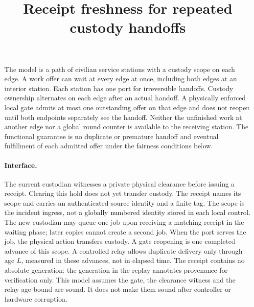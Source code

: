 \documentclass[11pt]{article}
\title{Receipt freshness for repeated custody handoffs}
\date{}
\begin{document}
\maketitle
The model is a path of civilian service stations with a custody scope on each
edge. A work offer can wait at every edge at once, including both edges at an
interior station. Each station has one port for irreversible handoffs. Custody
ownership alternates on each edge after an actual handoff. A physically
enforced local gate admits at most one outstanding offer on that edge and
does not reopen until both endpoints separately see the handoff. Neither
the unfinished work at another edge nor a global round counter is available
to the receiving station. The functional guarantee is no duplicate or
premature handoff and eventual fulfillment of each admitted offer under the
fairness conditions below.

\paragraph{Interface.}
The current custodian witnesses a private physical clearance before issuing a
receipt. Clearing this hold does not yet transfer custody. The receipt names
its scope and carries an authenticated source identity and a finite tag. The
scope is the incident ingress, not a globally numbered identity stored in
each local control. The new custodian may queue one job upon receiving a
matching receipt in the waiting phase; later copies cannot create a second
job. When the port serves the job, the physical action transfers custody.
A gate reopening is one completed advance of this scope. A controlled relay
allows duplicate delivery only through age \(L\), measured in these advances,
not in elapsed time. The receipt contains no absolute generation; the
generation in the replay annotates provenance for verification only. This
model assumes the gate, the clearance witness and the relay age bound are
sound. It does not make them sound after controller or hardware corruption.
\end{document}
